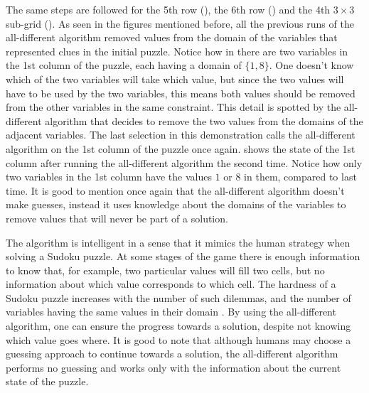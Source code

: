 \documentclass{l4proj}
\begin{document}
\vspace*{-0.5cm}

\noindent The same steps are followed for the 5th row (), the 6th row () and the 4th $3\times 3$ sub-grid (). As seen in the figures mentioned before, all the previous runs of the all-different algorithm removed values from the domain of the variables that represented clues in the initial puzzle. Notice how in  there are two variables in the 1st column of the puzzle, each having a domain of $\{1, 8\}$. One doesn't know which of the two variables will take which value, but since the two values will have to be used by the two variables, this means both values should be removed from the other variables in the same constraint. This detail is spotted by the all-different algorithm that decides to remove the two values from the domains of the adjacent variables. The last selection in this demonstration calls the all-different algorithm on the 1st column of the puzzle once again.  shows the state of the 1st column after running the all-different algorithm the second time. Notice how only two variables in the 1st column have the values $1$ or $8$ in them, compared to last time. It is good to mention once again that the all-different algorithm doesn't make guesses, instead it uses knowledge about the domains of the variables to remove values that will never be part of a solution.

\noindent The algorithm is intelligent in a sense that it mimics the human strategy when solving a Sudoku puzzle. At some stages of the game there is enough information to know that, for example, two particular values will fill two cells, but no information about which value corresponds to which cell. The hardness of a Sudoku puzzle increases with the number of such dilemmas, and the number of variables having the same values in their domain \cite{gomes2002completing}. By using the all-different algorithm, one can ensure the progress towards a solution, despite not knowing which value goes where. It is good to note that although humans may choose a guessing approach to continue towards a solution, the all-different algorithm performs no guessing and works only with the information about the current state of the puzzle.
\end{document}
